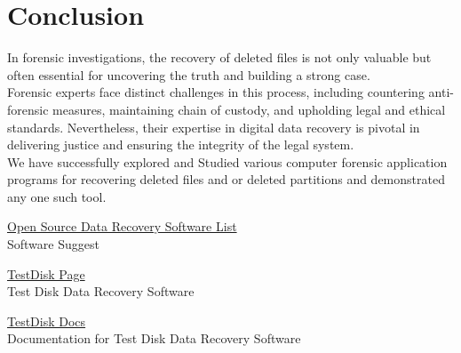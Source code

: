 \documentclass[11pt]{article}
\begin{document}
\section{Conclusion}
In forensic investigations, the recovery of deleted files is not only valuable but often essential for uncovering the truth and building a strong case. \\

Forensic experts face distinct challenges in this process, including countering anti-forensic measures, maintaining chain of custody, and upholding legal and ethical standards. Nevertheless, their expertise in digital data recovery is pivotal in delivering justice and ensuring the integrity of the legal system.\\

We have successfully explored and Studied various computer forensic application programs for recovering deleted files and or deleted partitions and demonstrated any one such tool.

\clearpage

\pagebreak
\begin{thebibliography}{}
    \href{https://www.softwaresuggest.com/blog/top-free-open-source-data-recovery-software/}{Open Source Data Recovery Software List}\\
    Software Suggest

    \href{https://www.cgsecurity.org/wiki/TestDisk}{TestDisk Page} \\Test Disk Data Recovery Software

    \href{https://www.cgsecurity.org/wiki/TestDisk}{TestDisk Docs} \\Documentation for Test Disk Data Recovery Software
\end{thebibliography}
\end{document}
